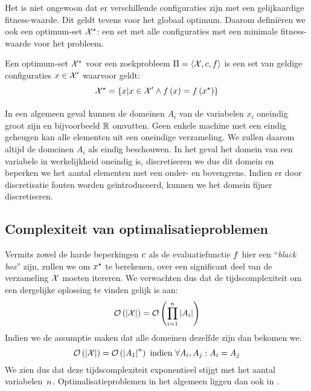 Het is niet ongewoon dat er verschillende configuraties zijn met een gelijkaardige fitness-waarde. Dit geldt tevens voor het globaal optimum. Daarom defini\"eren we ook een optimum-set $\mathcal{X}^{\star}$: een set met alle configuraties met een minimale fitness-waarde voor het probleem.

\begin{definition}
Een optimum-set $\mathcal{X}^{\star}$ voor een zoekprobleem $\Pi=\left\langle \mathcal{X},c,f\right\rangle$ is een set van geldige configuraties $x\in\mathcal{X}'$ waarvoor geldt:
\begin{equation}
\mathcal{X}^{\star}=\left\{ x|x\in\mathcal{X}'\wedge f\left(x\right)=f\left(x^{\star}\right)\right\}
\end{equation}
\end{definition}

\paragraph{}
In een algemeen geval kunnen de domeinen $A_i$ van de variabelen $x_i$ oneindig groot zijn en bijvoorbeeld $\mathbb{R}$ omvatten. Geen enkele machine met een eindig geheugen kan alle elementen uit een oneindige verzameling. We zullen daarom altijd de domeinen $A_i$ als eindig beschouwen. In het geval het domein van een variabele in werkelijkheid oneindig is, discretiseren we dus dit domein en beperken we het aantal elementen met een onder- en bovengrens. Indien er door discretisatie fouten worden ge\"introduceerd, kunnen we het domein fijner discretiseren.

\subsection{Complexiteit van optimalisatieproblemen}

Vermits zowel de harde beperkingen $c$ als de evaluatiefunctie $f$ hier een ``\emph{black box}'' zijn, zullen we om $x^{\star}$ te berekenen, over een significant deel van de verzameling $\mathcal{X}$ moeten itereren. We verwachten dus dat de tijdscomplexiteit om een dergelijke oplossing te vinden gelijk is aan:
\begin{equation}
\mathcal{O}\left(\left| \mathcal{X}\right|\right)=\mathcal{O}\left(\displaystyle\prod_{i=1}^n\left| A_i\right|\right)
\end{equation}
Indien we de assumptie maken dat alle domeinen dezelfde zijn dan bekomen we:
\begin{equation}
\mathcal{O}\left(\left| \mathcal{X}\right|\right)=\mathcal{O}\left(\left| A_1\right|^n\right)\mbox{ indien }\forall A_i,A_j: A_i=A_j
\end{equation}
We zien dus dat deze tijdscomplexiteit exponentieel stijgt met het aantal variabelen~$n$. Optimalisatieproblemen in het algemeen liggen dan ook in .

